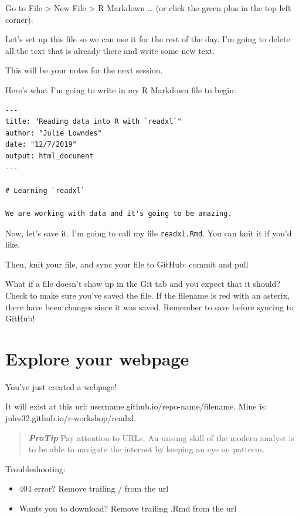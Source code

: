 \documentclass[]{book}
\providecommand{\tightlist}{%
  \setlength{\itemsep}{0pt}\setlength{\parskip}{0pt}}
\begin{document}
Go to File \textgreater{} New File \textgreater{} R Markdown \ldots{} (or click the green plus in the top left corner).

Let's set up this file so we can use it for the rest of the day. I'm going to delete all the text that is already there and write some new text.

This will be your notes for the next session.

Here's what I'm going to write in my R Markdown file to begin:

\begin{verbatim}
---
title: "Reading data into R with `readxl`"
author: "Julie Lowndes"
date: "12/7/2019"
output: html_document
---

# Learning `readxl`

We are working with data and it's going to be amazing.
\end{verbatim}

Now, let's save it. I'm going to call my file \texttt{readxl.Rmd}. You can knit it if you'd like.

Then, knit your file, and sync your file to GitHub: commit and pull

What if a file doesn't show up in the Git tab and you expect that it should? Check to make sure you've saved the file. If the filename is red with an asterix, there have been changes since it was saved. Remember to save before syncing to GitHub!

\hypertarget{explore-your-webpage}{%
\section{Explore your webpage}\label{explore-your-webpage}}

You've just created a webpage!

It will exist at this url: username.github.io/repo-name/filename. Mine is: jules32.github.io/r-workshop/readxl.

\begin{quote}
\textbf{\emph{ProTip}} Pay attention to URLs. An unsung skill of the modern analyst is to be able to navigate the internet by keeping an eye on patterns.
\end{quote}

Troubleshooting:

\begin{itemize}
\tightlist
\item
  404 error? Remove trailing / from the url
\item
  Wants you to download? Remove trailing .Rmd from the url
\end{itemize}
\end{document}
